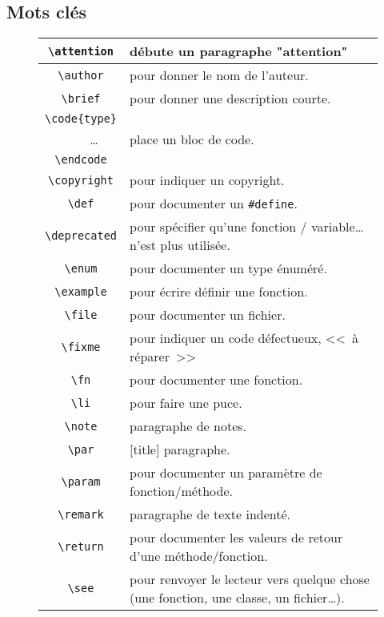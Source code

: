 	\subsection{Mots clés}
		\begin{figure}[H]
			\begin{changemargin}{-2.5cm}{-2.5cm}
			\begin{tabular}{@{\extracolsep{\fill}} | c || l | }
				\hline
				\verb+\attention+ & débute un paragraphe "attention" \\ \hline
				\verb+\author+ & pour donner le nom de l'auteur. \\ \hline
				\verb+\brief+ & pour donner une description courte. \\ \hline
				\verb+\code{type}+ & \\
				\verb+    +\dots & place un bloc de code. \\
				\verb+\endcode+ & \\ \hline
				\verb+\copyright+ & pour indiquer un copyright. \\ \hline
				\verb+\def+ & pour documenter un \verb+#define+. \\ \hline
				\verb+\deprecated+ & pour spécifier qu'une fonction / variable\dots n'est plus utilisée. \\ \hline
				\verb+\enum+ & pour documenter un type énuméré. \\ \hline
				\verb+\example+ & pour écrire définir une fonction. \\ \hline
				\verb+\file+ & pour documenter un fichier. \\ \hline
				\verb+\fixme+ & pour indiquer un code défectueux, << à réparer >> \\ \hline
				\verb+\fn+ & pour documenter une fonction. \\ \hline
				\verb+\li+ & pour faire une puce. \\ \hline
				\verb+\note+ & paragraphe de notes. \\ \hline
				\verb+\par+ & [title] paragraphe. \\ \hline
				\verb+\param+ & pour documenter un paramètre de fonction/méthode. \\ \hline
				\verb+\remark+ & paragraphe de texte indenté. \\ \hline
				\verb+\return+ & pour documenter les valeurs de retour d'une méthode/fonction. \\ \hline
				\verb+\see+ & pour renvoyer le lecteur vers quelque chose (une fonction, une classe, un fichier\dots). \\ \hline

\end{tabular}
\end{changemargin}
\end{figure}
